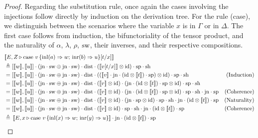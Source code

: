 \documentclass[a4paper,UKenglish,cleveref, autoref, thm-restate]{lipics-v2021}
\begin{document}
\begin{proof}
Regarding the substitution rule, once again the cases involving the injections follow directly by induction on the derivation tree. For the rule (case), we distinguish between the scenarios where the variable $x$ is in $\Gamma$ or in $\Delta$. The first case follows from induction, the bifunctoriality of the tensor product, and the naturality of $\alpha$, $\lambda$, $\rho$, $\mathrm{sw}$, their inverses, and their respective compositions.
\begin{align*}
  &[\![E, Z \vljud \text{case } v \,  \{\text{inl} (a) \Rightarrow w ;\, \text{inr} (b) \Rightarrow u\} [t/x]]\!] \\
  & \triangleq \left[[\![ w ]\!] ,[\![ u ]\!]\right] \comp (\text{jn}\comp \sw \oplus \text{jn} \comp \sw) \comp \dist \comp  ([\![ v [t/x] ]\!]   \otimes \text{id})  \comp \text{sp} \comp \text{sh} \\
  & = \left[[\![ w ]\!] ,[\![ u ]\!]\right] \comp (\text{jn} \comp \sw \oplus \text{jn} \comp \sw)  \comp \dist \comp (([\![ v]\!]  \comp \text{jn} \comp (\text{id} \otimes [\![  t ]\!] ) \comp \text{sp} )\otimes \text{id})  \comp \text{sp} \comp \text{sh} & {\text{(Induction)}} \\
  & =  \left[[\![ w ]\!] ,[\![ u ]\!]\right] \comp (\text{jn} \comp \sw \oplus \text{jn} \comp \sw)  \comp \dist  \comp ([\![ v]\!] \otimes \text{id}) \comp (\text{jn} \comp (\text{id} \otimes [\![  t ]\!] ) \comp \text{sp} \otimes \text{id})  \comp \text{sp}\comp \text{sh}\\
  & = \left[[\![ w ]\!] ,[\![ u ]\!]\right] \comp (\text{jn} \comp \sw \oplus \text{jn} \comp \sw)  \comp \dist  \comp ([\![ v]\!] \otimes \text{id})  \comp (\text{jn} \comp (\text{id} \otimes [\![  t ]\!] ) \comp \text{sp} \otimes \text{id})  \comp \text{sp} \comp \text{sh} \comp \text{jn} \comp \text{sp} & {(\text{Coherence})} \\
  & = \left[[\![ w ]\!] ,[\![ u ]\!]\right] \comp (\text{jn} \comp \sw \oplus \text{jn} \comp \sw)  \comp \dist  \comp ([\![ v]\!] \otimes \text{id}) \comp (\text{jn}\comp \text{sp} \otimes   \id) \comp \text{sp}   \comp \text{sh} \comp \text{jn}\comp (\text{id} \otimes [\![ t ]\!] ) \comp \text{sp}  & {(\text{Naturality})}   \\
  & = \left[[\![ w ]\!] ,[\![ u ]\!]\right] \comp (\text{jn} \comp \sw \oplus \text{jn}\comp \sw)  \comp \dist  \comp ([\![ v]\!] \otimes \text{id}) \comp \text{sp}  \comp \text{sh}  \comp  \text{jn} \comp (\text{id} \otimes [\![ t ]\!] ) \comp \text{sp}  & {(\text{Coherence})}   \\
  & \triangleq \, [\![E,  x \vljud \text{case } v\,  \{\text{inl} (x) \Rightarrow w ;\, \text{inr} (y) \Rightarrow u\}]\!]  \comp  \text{jn} \comp (\text{id} \otimes [\![ t ]\!] ) \comp \text{sp}

\end{align*}
\end{proof}
\end{document}
